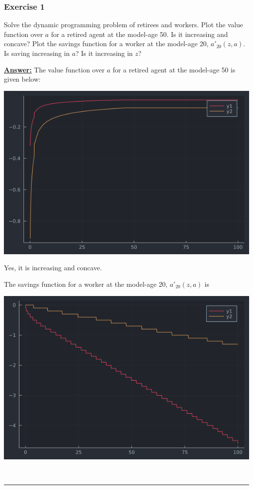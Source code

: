 \documentclass{article} %
\theoremstyle{definition}
\newenvironment{solution}[1][Answer]{\begin{singlespace}\underline{\textbf{#1:}}\quad }{\ \rule{0.3em}{0.3em}\end{singlespace}} %
\begin{document}
	\subsubsection*{Exercise 1}
	Solve the dynamic programming problem of retirees and workers. Plot the value function over $ a $ for a retired agent at the model-age 50. Is it increasing and concave? Plot the savings function for a worker at the
	model-age 20, $ a'_{20}(z, a) $. Is saving increasing in $ a $? Is it increasing in $ z $?
	\begin{solution}
		The value function over $ a $ for a retired agent at the model-age 50 is given below:
		\begin{center}
			\includegraphics[width=\linewidth]{../Figures/val_fun50.png}
		\end{center}
		Yes, it is increasing and concave.
		
		The savings function for a worker at the model-age 20, $ a'_{20}(z, a) $ is 
		\begin{center}
			\includegraphics[width=\linewidth]{../Figures/savings20.png}
		\end{center}
	\end{solution}
\end{document}

